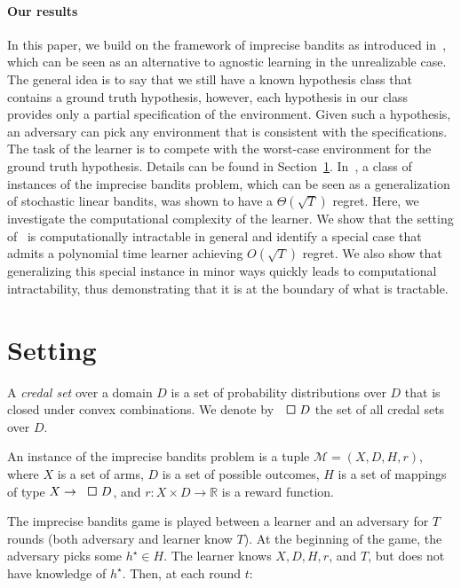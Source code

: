 \paragraph{Our results} In this paper, we build on the framework of imprecise bandits as introduced in~\citep{kosoy2025imprecise}, which can be seen as an alternative to agnostic learning in the unrealizable case. The general idea is to say that we still have a known hypothesis class that contains a ground truth hypothesis, however, each hypothesis in our class provides only a partial specification of the environment. Given such a hypothesis, an adversary can pick any environment that is consistent with the specifications. The task of the learner is to compete with the worst-case environment for the ground truth hypothesis. Details can be found in Section~\ref{sec:setting}. In~\citep{kosoy2025imprecise}, a class of instances of the imprecise bandits problem, which can be seen as a generalization of stochastic linear bandits, was shown to have a $\Theta(\sqrt{T})$ regret. Here, we investigate the computational complexity of the learner. We show that the setting of~\citep{kosoy2025imprecise} is computationally intractable in general and identify a special case that admits a polynomial time learner achieving $O(\sqrt{T})$ regret. We also show that generalizing this special instance in minor ways quickly leads to computational intractability, thus demonstrating that it is at the boundary of what is tractable.

\section{Setting}
\label{sec:setting}
A \emph{credal set} over a domain $D$ is a set of probability distributions over $D$ that is closed under convex combinations. We denote by $\credal D$ the set of all credal sets over $D$.

An instance of the imprecise bandits problem is a tuple $\mathcal{M} = \left( X , D , H , r \right)$, where $X$ is a set of arms, $D$ is a set of possible outcomes, $H$ is a set of mappings of type $X \to \credal D$, and $r : X \times D \to \mathbb{R}$ is a reward function.

The imprecise bandits game is played between a learner and an adversary for $T$ rounds (both adversary and learner know $T$). At the beginning of the game, the adversary picks some $h^{\star} \in H$. The learner knows $X , D , H , r$, and $T$, but does not have knowledge of $h^{\star}$. Then, at each round $t$:

